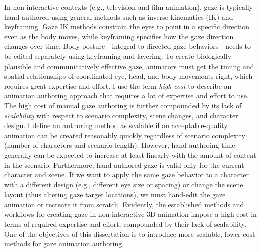 In non-interactive contexts (e.g., television and film animation), gaze is typically hand-authored using general methods such as inverse kinematics (IK) and keyframing. Gaze IK methods constrain the eyes to point in a specific direction even as the body moves, while keyframing specifies how the gaze direction changes over time. Body posture---integral to directed gaze behaviors---needs to be edited separately using keyframing and layering. To create biologically plausible and communicatively effective gaze, animators must get the timing and spatial relationships of coordinated eye, head, and body movements right, which requires great expertise and effort. I use the term \emph{high-cost} to describe an animation authoring approach that requires a lot of expertise and effort to use. The high cost of manual gaze authoring is further compounded by its lack of \emph{scalability} with respect to scenario complexity, scene changes, and character design. I define an authoring method as scalable if an acceptable-quality animation can be created reasonably quickly regardless of scenario complexity (number of characters and scenario length). However, hand-authoring time generally can be expected to increase at least linearly with the amount of content in the scenario. Furthermore, hand-authored gaze is valid only for the current character and scene. If we want to apply the same gaze behavior to a character with a different design (e.g., different eye size or spacing) or change the scene layout (thus altering gaze target locations), we must hand-edit the gaze animation or recreate it from scratch. Evidently, the established methods and workflows for creating gaze in non-interactive 3D animation impose a high cost in terms of required expertise and effort, compounded by their lack of scalability. One of the objectives of this dissertation is to introduce more scalable, lower-cost methods for gaze animation authoring.

